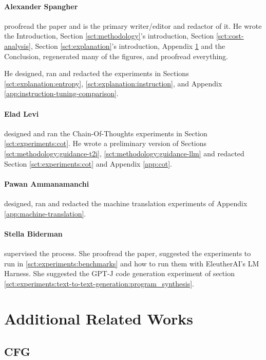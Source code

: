 \documentclass{article}
\begin{document}
\paragraph{Alexander Spangher} proofread the paper and is the primary writer/editor and redactor of it. He wrote the Introduction, Section \ref{sct:methodology}'s introduction, Section
\ref{sct:cost-analysis}, Section \ref{sct:explanation}'s introduction, Appendix \ref{app:related} and the Conclusion, regenerated many of the figures, and proofread everything.

He designed, ran and redacted the experiments in Sections \ref{sct:explanation:entropy}, \ref{sct:explanation:instruction}, and Appendix \ref{app:instruction-tuning-comparison}.

\paragraph{Elad Levi} designed and ran the Chain-Of-Thoughts experiments in Section \ref{sct:experiments:cot}. He wrote a preliminary version of Sections \ref{sct:methodology:guidance-t2i}, \ref{sct:methodology:guidance-llm} and redacted Section \ref{sct:experiments:cot} and Appendix \ref{app:cot}.

\paragraph{Pawan Ammanamanchi} designed, ran and redacted the machine translation experiments of Appendix \ref{app:machine-translation}. 

\paragraph{Stella Biderman} supervised the process. She proofread the paper, suggested the experiments to run in \ref{sct:experiments:benchmarks} and how to run them with EleutherAI's LM Harness. She suggested the GPT-J code generation experiment of section \ref{sct:experiments:text-to-text-generation:program_synthesis}.

\section{Additional Related Works}
\label{app:related}

\subsection{CFG}
\end{document}
